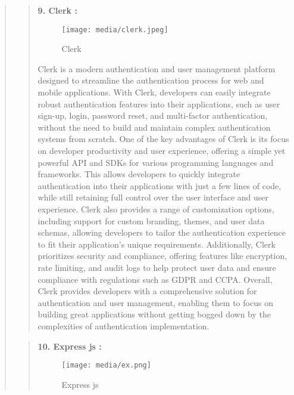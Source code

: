 \documentclass[12pt]{report}
\begin{document}
\begin{quote}
		\begin{quote}
			\textbf{9. Clerk :}\\
			\begin{figure}
				\centering
				\texttt{[image: media/clerk.jpeg]}\\
				\caption{Clerk}
			\end{figure}
			Clerk is a modern authentication and user management platform designed to streamline the authentication process for web and mobile applications. With Clerk, developers can easily integrate robust authentication features into their applications, such as user sign-up, login, password reset, and multi-factor authentication, without the need to build and maintain complex authentication systems from scratch. One of the key advantages of Clerk is its focus on developer productivity and user experience, offering a simple yet powerful API and SDKs for various programming languages and frameworks. This allows developers to quickly integrate authentication into their applications with just a few lines of code, while still retaining full control over the user interface and user experience. Clerk also provides a range of customization options, including support for custom branding, themes, and user data schemas, allowing developers to tailor the authentication experience to fit their application's unique requirements. Additionally, Clerk prioritizes security and compliance, offering features like encryption, rate limiting, and audit logs to help protect user data and ensure compliance with regulations such as GDPR and CCPA. Overall, Clerk provides developers with a comprehensive solution for authentication and user management, enabling them to focus on building great applications without getting bogged down by the complexities of authentication implementation.
		\end{quote}
		\clearpage
		
		\begin{quote}
			\textbf{10. Express js :}\\
			\begin{figure}
				\centering
				\texttt{[image: media/ex.png]}\\
				\caption{Express js}
			\end{figure}
			

\end{quote}
\end{quote}
\end{document}
